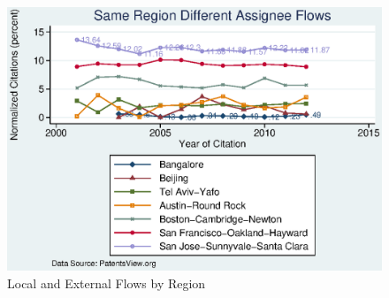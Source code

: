 \documentclass[12pt]{article}
\begin{document}
\\\\
\begin{figure}[h]
\begin{centering}
  \includegraphics[width=\textwidth]{SameRegionDiffAssigneeFlows}
  \caption{Local and External Flows by Region}
  \label{fig:SameRegionDiffAssigneeFlows}
\end{centering}
\end{figure}
\end{document}
